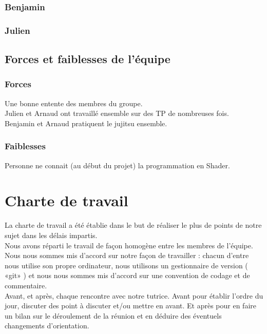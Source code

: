 \documentclass[a4paper,10pt]{article}
\begin{document}
\subsubsection{Benjamin}
\subsubsection{Julien}


\subsection{Forces et faiblesses de l'équipe}
\subsubsection{Forces}
Une bonne entente des membres du groupe.\\
Julien et Arnaud ont travaillé ensemble sur des TP de nombreuses fois.\\
Benjamin et Arnaud pratiquent le jujitsu ensemble.\\

\subsubsection{Faiblesses}
Personne ne connait (au début du projet) la programmation en Shader.\\







\section{Charte de travail}
La charte de travail a été établie dans le but de réaliser le plus de
points de notre sujet dans les délais impartis.  \\

Nous avons réparti le travail de façon homogène entre les membres de
l'équipe.  Nous nous sommes mis d'accord sur notre façon de travailler
: chacun d'entre nous utilise son propre ordinateur, nous utilisons un
gestionnaire de version ( «git» ) et nous nous sommes mis d'accord sur
une convention de codage et de commentaire. \\

Avant, et après, chaque rencontre avec notre tutrice. Avant pour
établir l'ordre du jour, discuter des point à discuter et/ou mettre en
avant. Et après pour en faire un bilan sur le déroulement de la
réunion et en déduire des éventuels changements d'orientation. \\
\end{document}
